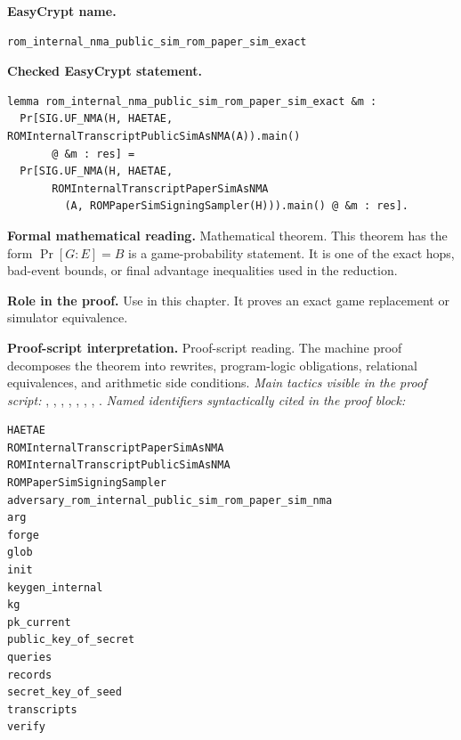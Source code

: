 \begin{formaltheorem}
\noindent\textbf{EasyCrypt name.}
\begin{lstlisting}[language=EasyCrypt,basicstyle=\ttfamily\scriptsize]
rom_internal_nma_public_sim_rom_paper_sim_exact
\end{lstlisting}
\noindent\textbf{Checked EasyCrypt statement.}
\begin{lstlisting}[language=EasyCrypt,basicstyle=\ttfamily\scriptsize]
lemma rom_internal_nma_public_sim_rom_paper_sim_exact &m :
  Pr[SIG.UF_NMA(H, HAETAE, ROMInternalTranscriptPublicSimAsNMA(A)).main()
       @ &m : res] =
  Pr[SIG.UF_NMA(H, HAETAE,
       ROMInternalTranscriptPaperSimAsNMA
         (A, ROMPaperSimSigningSampler(H))).main() @ &m : res].
\end{lstlisting}
\noindent\textbf{Formal mathematical reading.}
Mathematical theorem. This theorem has the form \(\Pr[G:E] = B\) is a game-probability statement.  It is one of the exact hops, bad-event bounds, or final advantage inequalities used in the reduction.

\noindent\textbf{Role in the proof.}
Use in this chapter. It proves an exact game replacement or simulator equivalence.

\noindent\textbf{Proof-script interpretation.}
Proof-script reading. The machine proof decomposes the theorem into rewrites, program-logic obligations, relational equivalences, and arithmetic side conditions.
\emph{Main tactics visible in the proof script:} , , , , , , , .
\emph{Named identifiers syntactically cited in the proof block:}
\begin{lstlisting}[language=EasyCrypt,basicstyle=\ttfamily\scriptsize]
HAETAE
ROMInternalTranscriptPaperSimAsNMA
ROMInternalTranscriptPublicSimAsNMA
ROMPaperSimSigningSampler
adversary_rom_internal_public_sim_rom_paper_sim_nma
arg
forge
glob
init
keygen_internal
kg
pk_current
public_key_of_secret
queries
records
secret_key_of_seed
transcripts
verify
\end{lstlisting}

\end{formaltheorem}

